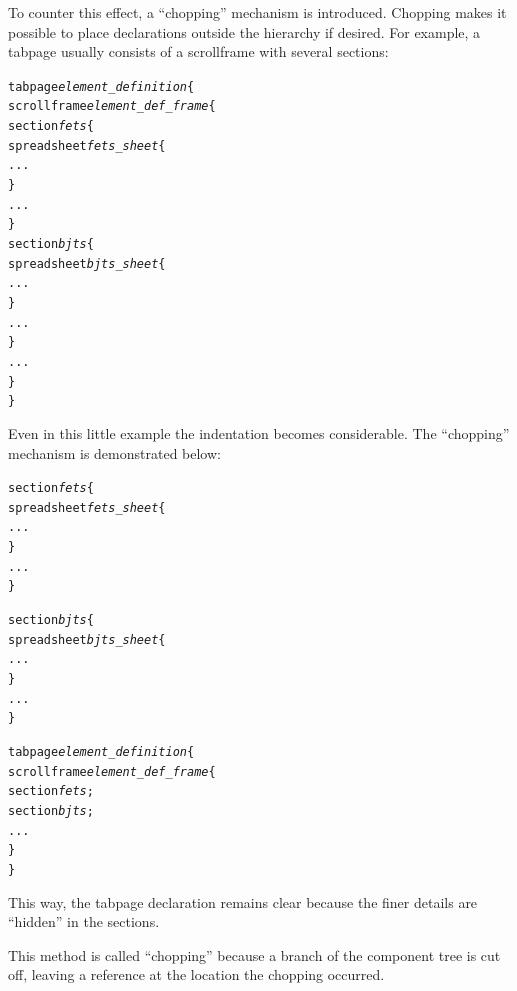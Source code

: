 To counter this effect, a ``chopping'' mechanism is introduced. Chopping makes
it possible to place declarations outside the hierarchy if desired. For
example, a tabpage usually consists of a scrollframe with several sections:
\begin{alltt}
tabpage \emph{element_definition} \{
    scrollframe \emph{element_def_frame} \{
        section \emph{fets} \{
            spreadsheet \emph{fets_sheet} \{
                ...
            \}
            ...
        \}
        section \emph{bjts} \{
            spreadsheet \emph{bjts_sheet} \{
                ...
            \}
            ...
        \}
        ...
    \}
\}
\end{alltt}
Even in this little example the indentation becomes considerable. The
``chopping'' mechanism is demonstrated below:
\begin{alltt}
section \emph{fets} \{
    spreadsheet \emph{fets_sheet} \{
        ...
    \}
    ...
\}

section \emph{bjts} \{
    spreadsheet \emph{bjts_sheet} \{
        ...
    \}
    ...
\}

tabpage \emph{element_definition} \{
    scrollframe \emph{element_def_frame} \{
        section \emph{fets};
        section \emph{bjts};
        ...
    \}
\}
\end{alltt}
This way, the tabpage declaration remains clear because the finer details are
``hidden'' in the sections.

This method is called ``chopping'' because a branch of the component tree is
cut off, leaving a reference at the location the chopping occurred.

